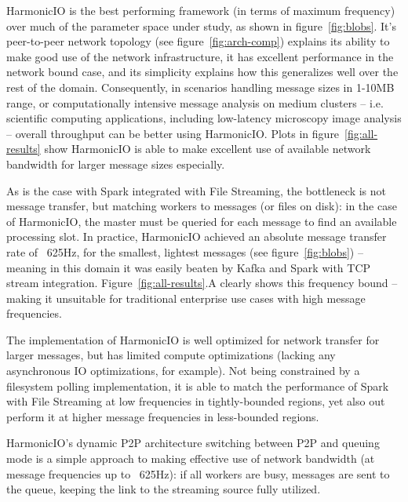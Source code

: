 \documentclass[conference]{IEEEtran}
\begin{document}

HarmonicIO is the best performing framework (in terms of maximum frequency) over much of the parameter space under study, as shown in figure~\ref{fig:blobs}. 
It's peer-to-peer network topology (see figure~\ref{fig:arch-comp}) explains its ability to make good use of the network infrastructure, it has excellent performance in the network bound case, and its simplicity explains how this generalizes well over the rest of the domain. Consequently, in scenarios handling message sizes in 1-10MB range, or computationally intensive message analysis on medium clusters -- i.e. scientific computing applications, including low-latency microscopy image analysis -- overall throughput can be better using HarmonicIO. Plots in figure~\ref{fig:all-results} show HarmonicIO is able to make excellent use of available network bandwidth for larger message sizes especially.

As is the case with Spark integrated with File Streaming, the bottleneck is not message transfer, but matching workers to messages (or files on disk): in the case of HarmonicIO, the master must be queried for each message to find an available processing slot. In practice, HarmonicIO achieved an absolute message transfer rate of ~625Hz, for the smallest, lightest messages (see figure~\ref{fig:blobs}) -- meaning in this domain it was easily beaten by Kafka and Spark with TCP stream integration. Figure~\ref{fig:all-results}.A clearly shows this frequency bound -- making it unsuitable for traditional enterprise use cases with high message frequencies.

The implementation of HarmonicIO is well optimized for network transfer for larger messages, but has limited compute optimizations (lacking any asynchronous IO optimizations, for example). Not being constrained by a filesystem polling implementation, it is able to match the performance of Spark with File Streaming at low frequencies in tightly-bounded regions, yet also out perform it at higher message frequencies in less-bounded regions.

HarmonicIO's dynamic P2P architecture switching between P2P and queuing mode is a simple approach to making effective use of network bandwidth (at message frequencies up to ~625Hz): if all workers are busy, messages are sent to the queue, keeping the link to the streaming source fully utilized. 
\end{document}
